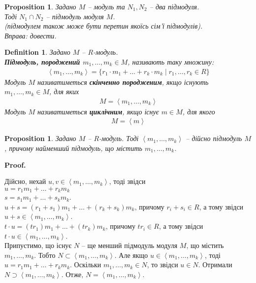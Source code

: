 \documentclass[a4paper, 10pt]{article}
\makeatletter
\theoremstyle{theoremdd}
\theoremstyle{theoremdd}
\newtheorem{definition}[theorem]{Definition}
\theoremstyle{theoremdd}
\theoremstyle{theoremdd}
\theoremstyle{theoremdd}
\theoremstyle{theoremdd}
\theoremstyle{theoremdd}
\theoremstyle{theoremdd}
\theoremstyle{theoremdd}
\newtheorem{proposition}[theorem]{Proposition}
\theoremstyle{theoremdd}
\theoremstyle{theoremdd}
\theoremstyle{theoremdd}
\theoremstyle{theoremdd}
\theoremstyle{theoremdd}
\theoremstyle{theoremdd}
\renewenvironment{proof}[1][Proof.\\]{\par
\pushQED{\hfill \qed}%
\normalfont \topsep6\p@\@plus6\p@\relax
\trivlist
\item\relax
{\bfseries
#1\@addpunct{.}}\hspace\labelsep\ignorespaces
}{%
\popQED\endtrivlist\@endpefalse
}
\makeatother
\begin{document}
\begin{proposition}
Задано $M$ -- модуль та $N_1,N_2$ -- два підмодуля.\\
Тоді $N_1 \cap N_2$ -- підмодуль модуля $M$.\\
(підмодулем також може бути перетин якоїсь сім'ї підмодулів).\\
\textit{Вправа: довести.}
\end{proposition}

\begin{definition}
Задано $M$ -- $R$-модуль.\\
\textbf{Підмодуль, породжений $m_1,\dots,m_k \in M$}, називають таку множину:
\begin{align*}
\left< m_1,\dots,m_k \right> = \{ r_1 \cdot m_1 + \dots + r_k \cdot m_k \mid r_1,\dots,r_k \in R \}
\end{align*}
Модуль $M$ називатиметься \textbf{скінченно породженим}, якщо існують $m_1,\dots,m_k \in M$, для яких
\begin{align*}
M = \left< m_1,\dots,m_k \right>
\end{align*}
Модуль $M$ називатиметься \textbf{циклічним}, якщо існує $m \in M$, для якого
\begin{align*}
M = \left< m \right>
\end{align*}
\end{definition}

\begin{proposition}
Задано $M$ -- $R$-модуль. Тоді $\left< m_1,\dots,m_k \right>$ -- дійсно підмодуль $M$, причому найменший підмодуль, що містить $m_1,\dots,m_k$.
\end{proposition}

\begin{proof}
Дійсно, нехай $u,v \in \left< m_1,\dots,m_k\right>$, тоді звідси\\
$u = r_1 m_1 + \dots + r_k m_k$\\
$s = s_1 m_1 + \dots + s_k m_k$.\\
$u + s = (r_1 + s_1)m_1 + \dots + (r_k + s_k)m_k$, причому $r_i + s_i \in R$, а тому звідси $u + s \in \left< m_1,\dots,m_k\right>$.\\
$t \cdot u = (t r_1) m_1 + \dots + (t r_k) m_k$, причому $t r_i \in R$, а тому звідси $t \cdot u \in \left< m_1,\dots,m_k\right>$.
\bigskip \\
Припустимо, що існує $N$ -- ще менший підмодуль модуля $M$, що містить $m_1,\dots,m_k$. Тобто $N \subset \left< m_1,\dots,m_k\right>$. Але якщо $u \in \left< m_1,\dots,m_k\right>$, тоді $u = r_1 m_1 + \dots + r_k m_k$. Оскільки $m_1,\dots,m_k \in N$, то звідси $u \in N$. Отримали $N \supset \left< m_1,\dots,m_k\right>$. Отже, $N = \left< m_1,\dots,m_k\right>$.
\end{proof}
\end{document}
